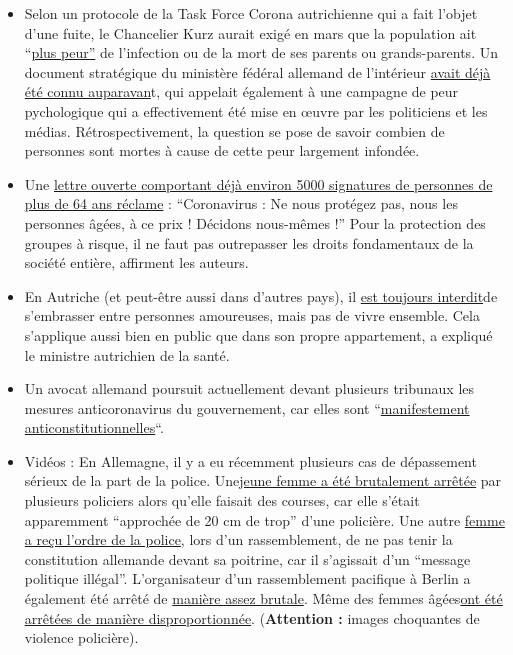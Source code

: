 \begin{itemize}
\tightlist
\item
  Selon un protocole de la Task Force Corona autrichienne qui a fait
  l'objet d'une fuite, le Chancelier Kurz aurait exigé en mars que la
  population ait
  ``\href{https://www.derstandard.de/story/2000117131591/sitzungsprotokoll-der-taskforce-corona-ueber-zu-wenig-angst-in-der}{plus
  peur''} de l'infection ou de la mort de ses parents ou grands-parents.
  Un document stratégique du ministère fédéral allemand de l'intérieur
  \href{https://fragdenstaat.de/dokumente/4123-wie-wir-covid-19-unter-kontrolle-bekommen/}{avait
  déjà été connu auparavan}t, qui appelait également à une campagne de
  peur pychologique qui a effectivement été mise en œuvre par les
  politiciens et les médias. Rétrospectivement, la question se pose de
  savoir combien de personnes sont mortes à cause de cette peur
  largement infondée.
\item
  Une
  \href{https://www.change.org/p/bundeskanzlerin-corona-sch\%C3\%BCtzen-sie-\%C3\%A4ltere-nicht-um-diesen-preis-selbstbestimmt-altern-und-sterben}{lettre
  ouverte comportant déjà environ 5000 signatures de personnes de plus
  de 64 ans réclame} : ``Coronavirus : Ne nous protégez pas, nous les
  personnes âgées, à ce prix ! Décidons nous-mêmes !'' Pour la
  protection des groupes à risque, il ne faut pas outrepasser les droits
  fondamentaux de la société entière, affirment les auteurs.
\item
  En Autriche (et peut-être aussi dans d'autres pays), il
  \href{https://www.unsertirol24.com/2020/04/29/oeffentliches-kuessen-wird-unter-strafe-gestellt/}{est
  toujours interdit}de s'embrasser entre personnes amoureuses, mais pas
  de vivre ensemble. Cela s'applique aussi bien en public que dans son
  propre appartement, a expliqué le ministre autrichien de la santé.
\item
  Un avocat allemand poursuit actuellement devant plusieurs tribunaux
  les mesures anticoronavirus du gouvernement, car elles sont
  ``\href{https://www.rubikon.news/artikel/eklatant-verfassungswidrig-2}{manifestement
  anticonstitutionnelles}``.
\item
  Vidéos : En Allemagne, il y a eu récemment plusieurs cas de
  dépassement sérieux de la part de la police.
  Une\href{https://www.youtube.com/watch?v=TZrKv4-jkK8}{jeune femme a
  été brutalement arrêtée} par plusieurs policiers alors qu'elle faisait
  des courses, car elle s'était apparemment ``approchée de 20 cm de
  trop'' d'une policière. Une autre
  \href{https://twitter.com/ChristianFritze/status/1256609660318224385}{femme
  a reçu l'ordre de la police}, lors d'un rassemblement, de ne pas tenir
  la constitution allemande devant sa poitrine, car il s'agissait d'un
  ``message politique illégal''. L'organisateur d'un rassemblement
  pacifique à Berlin a également été arrêté de
  \href{https://www.youtube.com/watch?v=NbV2OH3uYxI}{manière assez
  brutale}. Même des femmes
  âgées\href{https://www.youtube.com/watch?v=Bn11jXTjh_Y}{ont été
  arrêtées de manière disproportionnée}. (\textbf{Attention :} images
  choquantes de violence policière).
\end{itemize}

